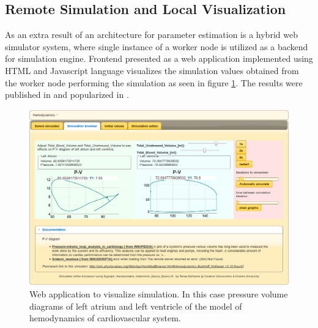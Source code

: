 \subsection{Remote Simulation and Local Visualization}
As an extra result of an architecture for parameter estimation is a hybrid web simulator system, where single instance of a worker node is utilized as a backend for simulation engine. Frontend presented as a web application implemented using HTML and Javascript language visualizes the simulation values obtained from the worker node performing the simulation as seen in figure \ref{fig:sim.physiovalues}.
The results were published in \cite{Kulhanek2013c} and popularized in \cite{Kulhanek2013b}.
\begin{figure}[htb]
    \centering
    \includegraphics[width=1\textwidth]{chapter7/sim-physiovalues.png}
    \caption{Web application to visualize simulation. In this case pressure volume diagrams of left atrium and left ventricle of the model of hemodynamics of cardiovascular system.}
    \label{fig:sim.physiovalues}
\end{figure}

